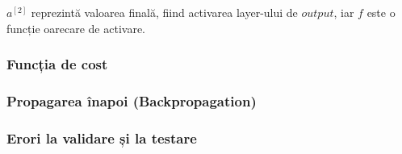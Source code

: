 $a^{[2]}$ reprezintă valoarea finală, fiind activarea layer-ului de $output$, iar $f$ este o funcție oarecare de activare.

\subsubsection{Funcția de cost}
\subsubsection{Propagarea înapoi (Backpropagation)}
\subsubsection{Erori la validare și la testare}
